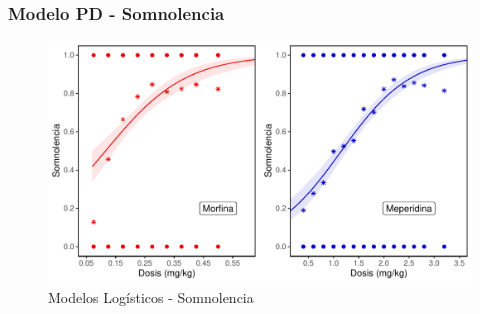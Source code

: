 \documentclass[10pt]{beamer}
\begin{document}
	
	\begin{frame}
		\frametitle{Modelo PD - Somnolencia}
		\begin{figure}[H]
			\centering
			\includegraphics[width=0.9\linewidth]{Figuras/Somnolencia}
			\caption[Modelos Logísticos - Somnolencia]{Modelos Logísticos - Somnolencia}
			\label{fig:1}
		\end{figure}
		
	\end{frame}
\end{document}
